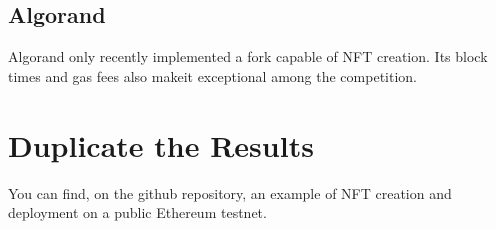 \documentclass{article}
\begin{document}
\subsection{Algorand}
Algorand only recently implemented a fork capable of NFT creation. Its block times and gas fees also makeit exceptional among the competition. \cite{gilad2017algorand}

\section{Duplicate the Results}
You can find, on the github repository, an example of NFT creation and deployment on a public Ethereum testnet.



\end{document}
